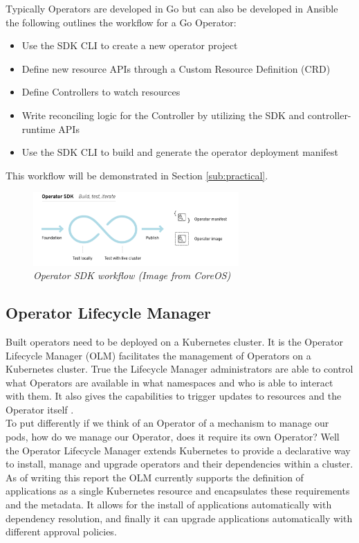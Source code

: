 Typically Operators are developed in Go but can also be developed in Ansible the following outlines the workflow for a Go Operator:
\begin{itemize}
    \item Use the SDK CLI to create a new operator project
    \item Define new resource APIs through a Custom Resource Definition (CRD)
    \item Define Controllers to watch resources
    \item Write reconciling logic for the Controller by utilizing the SDK and controller-runtime APIs
    \item Use the SDK CLI to build and generate the operator deployment manifest
\end{itemize}
This workflow will be demonstrated in Section \ref{sub:practical}.

\begin{figure}[!ht]
\centering
\includegraphics*[width=0.7\textwidth]{images/op20.png}
\caption{\em Operator SDK workflow (Image from CoreOS)}
\label{img:op_sdk}
\end{figure}

\subsection{Operator Lifecycle Manager}
Built operators need to be deployed on a Kubernetes cluster. It is the Operator Lifecycle Manager (OLM) facilitates the management of Operators on a Kubernetes cluster. True the Lifecycle Manager administrators are able to control what Operators are available in what namespaces and who is able to interact with them. It also gives the capabilities to trigger updates to resources and the Operator itself \citep{operator-framework_2018}.
\\ To put differently if we think of an Operator of a mechanism to manage our pods, how do we manage our Operator, does it require its own Operator? Well the Operator Lifecycle Manager extends Kubernetes to provide a declarative way to install, manage and upgrade operators and their dependencies within a cluster. As of writing this report the OLM currently supports the definition of applications as a single Kubernetes resource and encapsulates these requirements and the metadata. It allows for the install of applications automatically with dependency resolution, and finally it can upgrade applications automatically with different approval policies.

